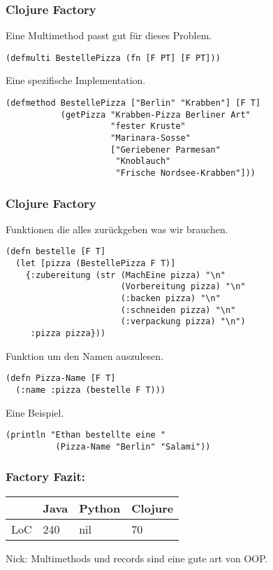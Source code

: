 \documentclass[compress, blue]{beamer}
\begin{document}
\begin{frame}[fragile]\frametitle{Clojure Factory}

Eine Multimethod passt gut für dieses Problem.
\pause
\begin{lstlisting}
(defmulti BestellePizza (fn [F PT] [F PT]))
\end{lstlisting}
\pause
Eine spezifische Implementation.
\pause
\begin{lstlisting}
(defmethod BestellePizza ["Berlin" "Krabben"] [F T]
           (getPizza "Krabben-Pizza Berliner Art"
                     "fester Kruste"
                     "Marinara-Sosse"
                     ["Geriebener Parmesan" 
                      "Knoblauch" 
                      "Frische Nordsee-Krabben"]))
\end{lstlisting}
\end{frame}

\begin{frame}[fragile]\frametitle{Clojure Factory}

Funktionen die alles zurückgeben was wir brauchen.
\pause
\begin{lstlisting}
(defn bestelle [F T]
  (let [pizza (BestellePizza F T)]
    {:zubereitung (str (MachEine pizza) "\n"
                       (Vorbereitung pizza) "\n"
                       (:backen pizza) "\n"
                       (:schneiden pizza) "\n"
                       (:verpackung pizza) "\n")
     :pizza pizza}))
\end{lstlisting}
\pause
Funktion um den Namen auszulesen.
\pause
\begin{lstlisting}
(defn Pizza-Name [F T]
  (:name :pizza (bestelle F T)))
\end{lstlisting}
\pause
Eine Beispiel.
\pause
\begin{lstlisting}
(println "Ethan bestellte eine " 
          (Pizza-Name "Berlin" "Salami"))
\end{lstlisting}

\end{frame}






\begin{frame}\frametitle{Factory Fazit:}
    \begin{tabular}{l | l l l}
         & Java &  Python & Clojure  \\
     \hline
        LoC & 240 &  nil & 70 \\
     \end{tabular}
 
  \begin{block}{Nick:}
    Multimethods und records sind eine gute art von OOP.
  \end{block}
\end{frame}
\end{document}
